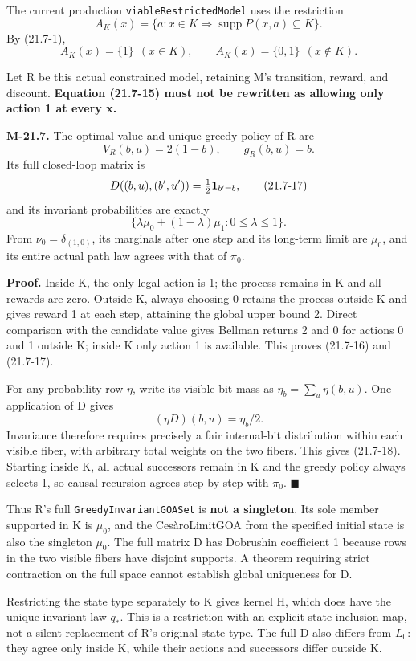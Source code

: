 \documentclass[
  english,
  11pt,
  oneside]{book}
\begin{document}
The current production \nolinkurl{viableRestrictedModel} uses the restriction \[A_K(x)=\{a:x\in K\Rightarrow \operatorname{supp}P(x,a)\subseteq K\}.\] By (21.7-1), \[A_K(x)=\{1\}\ \ (x\in K),\qquad A_K(x)=\{0,1\}\ \ (x\notin K). \tag{21.7-15}\]

Let R be this actual constrained model, retaining M's transition, reward, and discount. \textbf{Equation (21.7-15) must not be rewritten as allowing only action 1 at every x.}

\hypertarget{m-21-7}{}\label{m-21-7}

\textbf{M-21.7.} The optimal value and unique greedy policy of R are \[V_R(b,u)=2(1-b),\qquad g_R(b,u)=b.                   \tag{21.7-16}\] Its full closed-loop matrix is \[D((b,u),(b',u'))=\tfrac12{\bf1}_{b'=b},              \tag{21.7-17}\] and its invariant probabilities are exactly \[\{\lambda\mu_0+(1-\lambda)\mu_1:0\le\lambda\le1\}.   \tag{21.7-18}\] From \(\nu_0=\delta_{(1,0)}\), its marginals after one step and its long-term limit are \(\mu_0\), and its entire actual path law agrees with that of \(\pi_0\).

\textbf{Proof.} Inside K, the only legal action is 1; the process remains in K and all rewards are zero. Outside K, always choosing 0 retains the process outside K and gives reward 1 at each step, attaining the global upper bound 2. Direct comparison with the candidate value gives Bellman returns 2 and 0 for actions 0 and 1 outside K; inside K only action 1 is available. This proves (21.7-16) and (21.7-17).

For any probability row \(\eta\), write its visible-bit mass as \(\eta_b=\sum_u\eta(b,u)\). One application of D gives \[(\eta D)(b,u)=\eta_b/2.\] Invariance therefore requires precisely a fair internal-bit distribution within each visible fiber, with arbitrary total weights on the two fibers. This gives (21.7-18). Starting inside K, all actual successors remain in K and the greedy policy always selects 1, so causal recursion agrees step by step with \(\pi_0\). \(\blacksquare\)

Thus R's full \nolinkurl{GreedyInvariantGOASet} is \textbf{not a singleton}. Its sole member supported in K is \(\mu_0\), and the CesàroLimitGOA from the specified initial state is also the singleton \(\mu_0\). The full matrix D has Dobrushin coefficient 1 because rows in the two visible fibers have disjoint supports. A theorem requiring strict contraction on the full space cannot establish global uniqueness for D.

Restricting the state type separately to K gives kernel H, which does have the unique invariant law \(q_*\). This is a restriction with an explicit state-inclusion map, not a silent replacement of R's original state type. The full D also differs from \(L_0\): they agree only inside K, while their actions and successors differ outside K.
\end{document}
